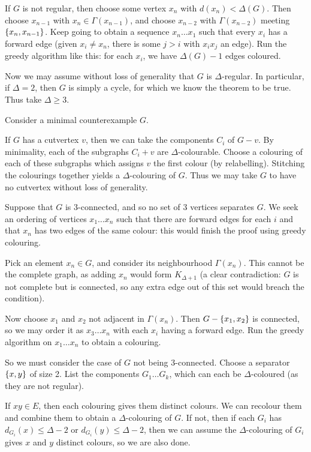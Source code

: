 \documentclass{article}
\begin{document}
\begin{prf}
    If $G$ is not regular, then choose some vertex $x_n$ with $d(x_n) < \Delta(G)$. Then choose $x_{n-1}$ with $x_n \in \Gamma(x_{n-1})$, and choose $x_{n-2}$ with $\Gamma(x_{n-2})$ meeting $\left\lbrace x_n, x_{n-1} \right\rbrace$. Keep going to obtain a sequence $x_n \dots x_1$ such that every $x_i$ has a forward edge (given $x_i \neq x_n$, there is some $j > i$ with $x_ix_j$ an edge). Run the greedy algorithm like this: for each $x_i$, we have $\Delta(G) - 1$ edges coloured.
    
    Now we may assume without loss of generality that $G$ is $\Delta$-regular. In particular, if $\Delta = 2$, then $G$ is simply a cycle, for which we know the theorem to be true. Thus take $\Delta \geq 3$.
    
    Consider a minimal counterexample $G$.
        
    If $G$ has a cutvertex $v$, then we can take the components $C_i$ of $G - v$. By minimality, each of the subgraphs $C_i + v$ are $\Delta$-colourable. Choose a colouring of each of these subgraphs which assigns $v$ the first colour (by relabelling). Stitching the colourings together yields a $\Delta$-colouring of $G$. Thus we may take $G$ to have no cutvertex without loss of generality.
    
    Suppose that $G$ is 3-connected, and so no set of 3 vertices separates $G$. We seek an ordering of vertices $x_1 \dots x_n$ such that there are forward edges for each $i$ and that $x_n$ has two edges of the same colour: this would finish the proof using greedy colouring.
    
    Pick an element $x_n \in G$, and consider its neighbourhood $\Gamma(x_n)$. This cannot be the complete graph, as adding $x_n$ would form $K_{\Delta+1}$ (a clear contradiction: $G$ is not complete but is connected, so any extra edge out of this set would breach the condition).
    
    Now choose $x_1$ and $x_2$ not adjacent in $\Gamma(x_n)$. Then $G - \left\lbrace x_1, x_2 \right\rbrace$ is connected, so we may order it as $x_3 \dots x_n$ with each $x_i$ having a forward edge. Run the greedy algorithm on $x_1 \dots x_n$ to obtain a colouring.
    
    So we must consider the case of $G$ not being 3-connected. Choose a separator $\left\lbrace x, y \right\rbrace$ of size 2. List the components $G_1 \dots G_k$, which can each be $\Delta$-coloured (as they are not regular).
    
    If $xy \in E$, then each colouring gives them distinct colours. We can recolour them and combine them to obtain a $\Delta$-colouring of $G$. If not, then if each $G_i$ has $d_{G_i}(x) \leq \Delta - 2$ or $d_{G_i}(y) \leq \Delta - 2$, then we can assume the $\Delta$-colouring of $G_i$ gives $x$ and $y$ distinct colours, so we are also done.
    

\end{prf}
\end{document}
